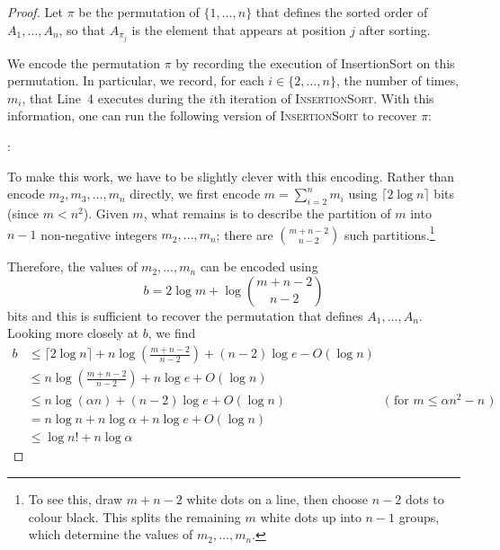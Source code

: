 \documentclass[lotsofwhite]{patmorin}
\begin{document}
\begin{proof}
Let $\pi$ be the permutation of $\{1,\ldots,n\}$ that defines the
sorted order of $A_1,\ldots,A_n$, so that $A_{\pi_j}$ is the element
that appears at position $j$ after sorting.

We encode the permutation $\pi$ by recording the execution of
InsertionSort on this permutation. In particular, we record, for each
$i\in\{2,\ldots,n\}$, the number of times, $m_i$, that Line~4 executes
during the $i$th iteration of \textsc{InsertionSort}. With this information,
one can run the following version of \textsc{InsertionSort} to recover $\pi$:

:
\begin{algorithmic}[1]
     \ENDFOR
  \ENDFOR
\end{algorithmic}
 
To make this work, we have to be slightly clever with this
encoding. Rather than encode $m_2,m_3,\ldots,m_n$ directly, we first
encode $m=\sum_{i=2}^{n} m_i$ using $\lceil 2\log n\rceil$ bits (since $m < n^2$). Given $m$, what
remains is to describe the partition of $m$ into $n-1$ non-negative
integers $m_2,\ldots,m_n$; there are $\binom{m+n-2}{n-2}$ such
partitions.\footnote{To see this, draw $m+n-2$ white dots on a line,
then choose $n-2$ dots to colour black. This splits the remaining $m$ white dots
up into $n-1$ groups, which determine the values of $m_2,\ldots,m_n$.}

Therefore, the values of $m_2,\ldots,m_n$ can be encoded using
\[
    b = 2\log m + \log\binom{m+n-2}{n-2}
\]
bits and this is sufficient to recover the permutation that defines
$A_1,\ldots,A_n$.  Looking more closely at $b$, we find
\begin{align*}
     b & \le \lceil 2\log n\rceil + n\log\left(\frac{m+n-2}{n-2}\right)
                  + (n-2)\log e
                  - O(\log n) \\
     & \le n\log\left(\frac{m+n-2}{n-2}\right)
                  + n\log e + O(\log n) \\
     & \le n\log(\alpha n) 
                  + (n-2)\log e
                  + O(\log n) & \text{( for $m\le \alpha n^2 - n$ )} \\
     & = n\log n + n\log\alpha
                  + n\log e
                  + O(\log n) \\
     & \le \log n! + n\log\alpha
\end{align*}







\end{proof}
\end{document}
